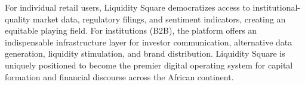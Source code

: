 \documentclass[11pt,a4paper]{article}
\begin{document}
For individual retail users, Liquidity Square democratizes access to institutional-quality market data, regulatory filings, and sentiment indicators, creating an equitable playing field. For institutions (B2B), the platform offers an indispensable infrastructure layer for investor communication, alternative data generation, liquidity stimulation, and brand distribution. Liquidity Square is uniquely positioned to become the premier digital operating system for capital formation and financial discourse across the African continent.
\end{document}
